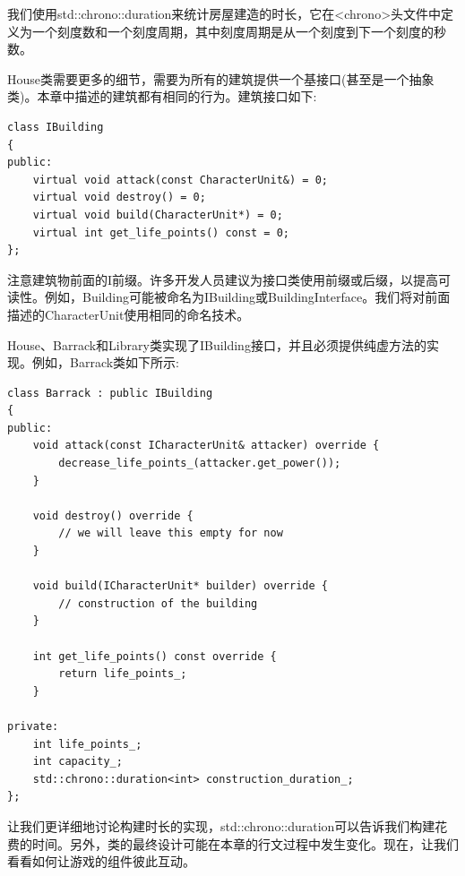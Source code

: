 我们使用std::chrono::duration来统计房屋建造的时长，它在<chrono>头文件中定义为一个刻度数和一个刻度周期，其中刻度周期是从一个刻度到下一个刻度的秒数。 \par
House类需要更多的细节，需要为所有的建筑提供一个基接口(甚至是一个抽象类)。本章中描述的建筑都有相同的行为。建筑接口如下: \par

\begin{lstlisting}[caption={}]
class IBuilding
{
public:
	virtual void attack(const CharacterUnit&) = 0;
	virtual void destroy() = 0;
	virtual void build(CharacterUnit*) = 0;
	virtual int get_life_points() const = 0;
};
\end{lstlisting}

注意建筑物前面的I前缀。许多开发人员建议为接口类使用前缀或后缀，以提高可读性。例如，Building可能被命名为IBuilding或BuildingInterface。我们将对前面描述的CharacterUnit使用相同的命名技术。 \par
House、Barrack和Library类实现了IBuilding接口，并且必须提供纯虚方法的实现。例如，Barrack类如下所示: \par

\begin{lstlisting}[caption={}]
class Barrack : public IBuilding
{
public:
	void attack(const ICharacterUnit& attacker) override {
		decrease_life_points_(attacker.get_power());
	}

	void destroy() override {
		// we will leave this empty for now
	}

	void build(ICharacterUnit* builder) override {
		// construction of the building
	}

	int get_life_points() const override {
		return life_points_;
	}

private:
	int life_points_;
	int capacity_;
	std::chrono::duration<int> construction_duration_;
};
\end{lstlisting}

让我们更详细地讨论构建时长的实现，std::chrono::duration可以告诉我们构建花费的时间。另外，类的最终设计可能在本章的行文过程中发生变化。现在，让我们看看如何让游戏的组件彼此互动。 \par

